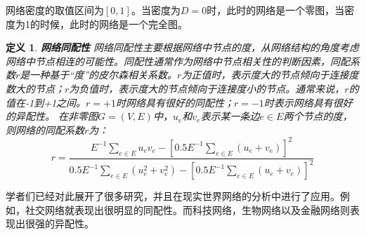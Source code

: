 \documentclass{ctexart}
\newtheorem{Definition}{\hspace{2em}定义}[section]
\begin{document}
                网络密度的取值区间为$[0,1]$。当密度为$D=0$时，此时的网络是一个零图，当密度为1的时候，此时的网络是一个完全图。

                \begin{Definition}
                    \textbf{网络同配性} 网络同配性主要根据网络中节点的度，从网络结构的角度考虑网络中节点相连的可能性。同配性通常作为网络中节点相关性的判断因素，同配系数$r$是一种基于“度”的皮尔森相关系数。$r$为正值时，表示度大的节点倾向于连接度数大的节点；$r$为负值时，表示度大的节点倾向于连接度小的节点。通常来说，$r$的值在-1到+1之间。$r=+1$时网络具有很好的同配性；$r=-1$时表示网络具有很好的异配性。
                    在非零图$G=(V,E)$中，$u_e$和$v_e$表示某一条边$e\in E$两个节点的度，则网络的同配系数$r$为：
                    \begin{equation}
                        r = \frac{E^{-1}\sum_{e\in E}u_ev_e - [0.5E^{-1}\sum_{e\in E}(u_e + v_e)]^2}{0.5E^{-1}\sum_{e\in E}(u_e^2+v_e^2)-[0.5E^{-1}\sum_{e\in E}(u_e+v_e)]^2}
                    \end{equation}
                \end{Definition}
                学者们已经对此展开了很多研究，并且在现实世界网络的分析中进行了应用。例如，社交网络就表现出很明显的同配性。而科技网络，生物网络以及金融网络则表现出很强的异配性。
\end{document}
